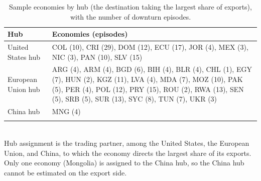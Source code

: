 \begin{table}[H]
\centering\small
\caption{Sample economies by hub (the destination taking the largest share of exports), with the number of downturn episodes.}
\label{tab:appcountries}
\begin{tabularx}{\textwidth}{@{}lX@{}}
\toprule
Hub & Economies (episodes) \\ \midrule
United States hub & COL (10), CRI (29), DOM (12), ECU (17), JOR (4), MEX (3), NIC (3), PAN (10), SLV (15) \\ \addlinespace
European Union hub & ARG (4), ARM (4), BGD (6), BIH (4), BLR (4), CHL (1), EGY (7), HUN (2), KGZ (11), LVA (4), MDA (7), MOZ (10), PAK (5), PER (4), POL (12), PRY (15), ROU (2), RWA (13), SEN (5), SRB (5), SUR (13), SYC (8), TUN (7), UKR (3) \\ \addlinespace
China hub & MNG (4) \\ \addlinespace
\bottomrule
\end{tabularx}
\\[2pt]\footnotesize{Hub assignment is the trading partner, among the United States, the European Union, and China, to which the economy directs the largest share of its exports. Only one economy (Mongolia) is assigned to the China hub, so the China hub cannot be estimated on the export side.}
\end{table}
